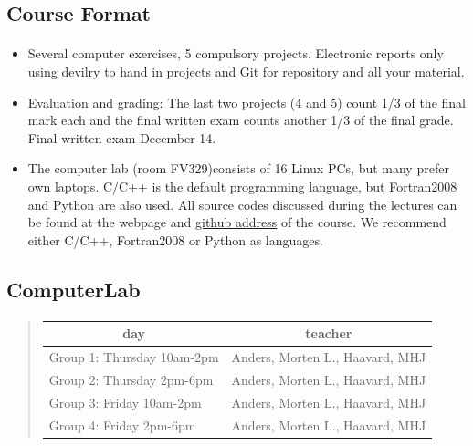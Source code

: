 \documentclass[%
oneside,                 %
final,                   %
10pt]{article}
\begin{document}
\noindent



\subsection{Course Format}


\paragraph{}
\begin{itemize}
  \item Several computer exercises, 5 compulsory projects. Electronic reports only using \href{{https://devilry.ifi.uio.no/}}{devilry} to hand in projects and \href{{https://github.com/}}{Git} for repository and all your material.

  \item Evaluation and grading: The last two projects (4 and 5) count 1/3 of the final mark each  and the  final written exam counts another 1/3 of the final grade. Final written exam December 14.

  \item The computer lab (room FV329)consists of 16 Linux PCs, but many prefer own laptops. C/C++ is the default programming language, but Fortran2008 and Python are also used. All source codes discussed during the lectures can be found at the webpage and \href{{https://github.com/CompPhysics/ComputationalPhysics1}}{github address} of the course. We recommend either C/C++, Fortran2008 or Python as languages.
\end{itemize}

\noindent



\subsection{ComputerLab}


\paragraph{}


\begin{quote}
\begin{tabular}{ll}
\hline
\multicolumn{1}{c}{ day } & \multicolumn{1}{c}{ teacher } \\
\hline
Group 1: Thursday 10am-2pm & Anders, Morten L., Haavard, MHJ \\
Group 2: Thursday 2pm-6pm  & Anders, Morten L., Haavard, MHJ \\
Group 3: Friday 10am-2pm   & Anders, Morten L., Haavard, MHJ \\
Group 4: Friday 2pm-6pm    & Anders, Morten L., Haavard, MHJ \\
\hline
\end{tabular}
\end{quote}
\end{document}
